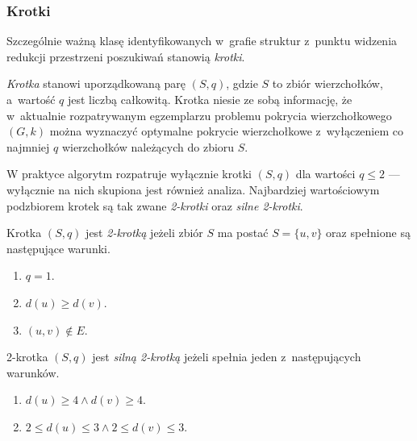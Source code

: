 \subsubsection{\textbf{Krotki}}
\label{sss_ckx_tuples}
\par{
  Szczególnie ważną klasę identyfikowanych w~grafie struktur z~punktu widzenia redukcji przestrzeni poszukiwań stanowią \emph{krotki}.
  \begin{definition}
    \emph{Krotka} stanowi uporządkowaną parę $(S, q)$, gdzie $S$ to zbiór wierzchołków, a~wartość $q$ jest liczbą całkowitą.
    Krotka niesie ze sobą informację, że w~aktualnie rozpatrywanym egzemplarzu problemu pokrycia wierzchołkowego $(G, k)$ można wyznaczyć optymalne pokrycie wierzchołkowe z~wyłączeniem co najmniej $q$ wierzchołków należących do zbioru $S$.
  \end{definition}
  W praktyce algorytm rozpatruje wyłącznie krotki $(S, q)$ dla wartości $q \leq 2$ --- wyłącznie na nich skupiona jest również analiza.
  Najbardziej wartościowym podzbiorem krotek są tak zwane \emph{2-krotki} oraz \emph{silne 2-krotki}.
  \begin{definition}
    Krotka $(S, q)$ jest \emph{2-krotką} jeżeli zbiór $S$ ma postać $S=\{u, v\}$ oraz spełnione są następujące warunki.
    \begin{enumerate}
      \item $q=1$.
      \item $d(u) \geq d(v)$.
      \item $(u, v) \notin E$.
    \end{enumerate}
  \end{definition}
  \begin{definition}
    2-krotka $(S, q)$ jest \emph{silną 2-krotką} jeżeli spełnia jeden z~następujących warunków.
    \begin{enumerate}
      \item $d(u) \geq 4 \land d(v) \geq 4$.
      \item $2 \leq d(u) \leq 3 \land 2 \leq d(v) \leq 3$.
    \end{enumerate}
  \end{definition}
}
